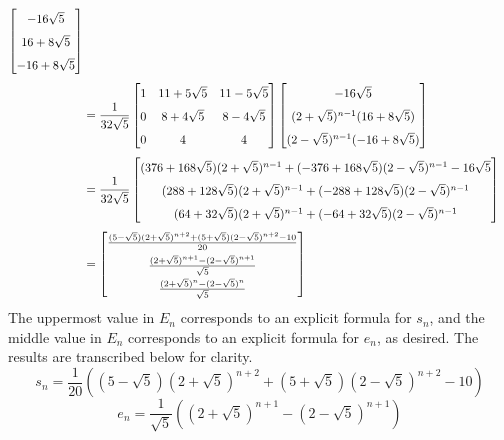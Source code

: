 \documentclass[titlepage]{article}
\begin{document}
\begin{align*}
    \begin{bmatrix}
        -16\sqrt{5}\\
        16+8\sqrt{5}\\
        -16+8\sqrt{5}\\
    \end{bmatrix}\\
    &= \frac{1}{32\sqrt{5}}
    \begin{bmatrix}
        1 & 11+5\sqrt{5} & 11-5\sqrt{5}\\
        0 & 8+4\sqrt{5} & 8-4\sqrt{5}\\
        0 & 4 & 4\\
    \end{bmatrix}
    \begin{bmatrix}
        -16\sqrt{5}\\
        (2+\sqrt{5})^{n-1}(16+8\sqrt{5})\\
        (2-\sqrt{5})^{n-1}(-16+8\sqrt{5})\\
    \end{bmatrix}\\
    &= \frac{1}{32\sqrt{5}}
    \begin{bmatrix}
        (376+168\sqrt{5})(2+\sqrt{5})^{n-1}+(-376+168\sqrt{5})(2-\sqrt{5})^{n-1}-16\sqrt{5}\\
        (288+128\sqrt{5})(2+\sqrt{5})^{n-1}+(-288+128\sqrt{5})(2-\sqrt{5})^{n-1}\\
        (64+32\sqrt{5})(2+\sqrt{5})^{n-1}+(-64+32\sqrt{5})(2-\sqrt{5})^{n-1}\\
    \end{bmatrix}\\
    &=
    \renewcommand{\arraystretch}{1.6}
    \begin{bmatrix}
        \frac{(5-\sqrt{5})(2+\sqrt{5})^{n+2}+(5+\sqrt{5})(2-\sqrt{5})^{n+2}-10}{20}\\
        \frac{(2+\sqrt{5})^{n+1}-(2-\sqrt{5})^{n+1}}{\sqrt{5}}\\
        \frac{(2+\sqrt{5})^n-(2-\sqrt{5})^n}{\sqrt{5}}\\
    \end{bmatrix}
\end{align*}
\endgroup
The uppermost value in $E_n$ corresponds to an explicit formula for $s_n$, and the middle value in $E_n$ corresponds to an explicit formula for $e_n$, as desired. The results are transcribed below for clarity.
\begin{equation}\label{eqn:s_n}
    s_n = \frac{1}{20}\left( \left( 5-\sqrt{5} \right)\left( 2+\sqrt{5} \right)^{n+2}+\left( 5+\sqrt{5} \right)\left( 2-\sqrt{5} \right)^{n+2}-10 \right)
\end{equation}
\begin{equation}\label{eqn:e_n}
    e_n = \frac{1}{\sqrt{5}}\left( \left( 2+\sqrt{5} \right)^{n+1}-\left( 2-\sqrt{5} \right)^{n+1} \right)
\end{equation}
\end{document}
